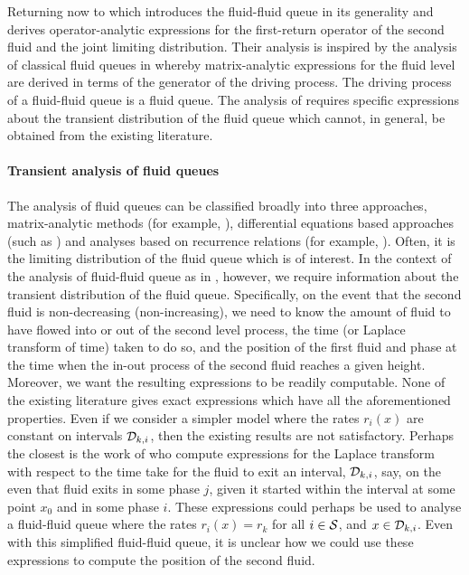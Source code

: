 Returning now to \cite{bo2014} which introduces the fluid-fluid queue in its generality and derives operator-analytic expressions for the first-return operator of the second fluid and the joint limiting distribution. Their analysis is inspired by the analysis of classical fluid queues in \cite{bean2005} whereby matrix-analytic expressions for the fluid level are derived in terms of the generator of the driving process. The driving process of a fluid-fluid queue is a fluid queue. The analysis of \cite{bo2014} requires specific expressions about the transient distribution of the fluid queue which cannot, in general, be obtained from the existing literature.

\paragraph{Transient analysis of fluid queues} The analysis of fluid queues can be classified broadly into three approaches, matrix-analytic methods (for example, \cite{ajr2005,ar2003,ar2004,bean2005b,bean2005,bot08,bean2009,dasilva2005,latouche2018}), differential equations based approaches (such as \cite{anick1982,kk1995,blnos2022}) and analyses based on recurrence relations (for example, \cite{sericola1998,sericola1999,sericola2001}). Often, it is the limiting distribution of the fluid queue which is of interest. In the context of the analysis of fluid-fluid queue as in \cite{bo2014}, however, we require information about the transient distribution of the fluid queue. Specifically, on the event that the second fluid is non-decreasing (non-increasing), we need to know the amount of fluid to have flowed into or out of the second level process, the time (or Laplace transform of time) taken to do so, and the position of the first fluid and phase at the time when the in-out process of the second fluid reaches a given height. Moreover, we want the resulting expressions to be readily computable. None of the existing literature gives exact expressions which have all the aforementioned properties. Even if we consider a simpler model where the rates \(r_i(x)\) are constant on intervals \(\mathcal{D}_{k,i}\), then the existing results are not satisfactory. Perhaps the closest is the work of \cite{bean2009} who compute expressions for the Laplace transform with respect to the time take for the fluid to exit an interval, \(\mathcal{D}_{k,i}\), say, on the even that fluid exits in some phase \(j\), given it started within the interval at some point \(x_0\) and in some phase \(i\). These expressions could perhaps be used to analyse a fluid-fluid queue where the rates \(r_i(x)=r_k\) for all \(i\in\mathcal{S}\), and \(x\in\mathcal{D}_{k,i}\). Even with this simplified fluid-fluid queue, it is unclear how we could use these expressions to compute the position of the second fluid. 

